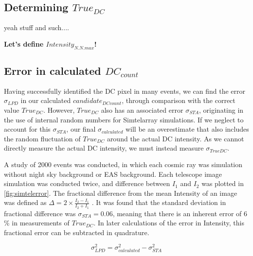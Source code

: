 \documentclass{article}
\begin{document}
\subsection{Determining $True_{DC}$}
yeah stuff and such....

\textbf{Let's define $Intensity_{N.N.max}$!}
 

\subsection{Error in calculated $DC_{count}$}
Having successfully identified the DC pixel in many events, we can find the error $\sigma_{LPD}$ in our calculated $candidate_{DC count}$, through comparison with the correct value $True_{DC}$. However, $True_{DC}$ also has an associated error $\sigma_{STA}$, originating in the use of internal random numbers for Sim\textunderscore telarray simulations. If we neglect to account for this $\sigma_{STA}$, our final $\sigma_{calculated}$ will be an overestimate that also includes the random fluctuation of $True_{DC}$ around the actual DC intensity. As we cannot directly measure the actual DC intensity, we must instead measure $\sigma_{TrueDC}$. 

A study of 2000 events was conducted, in which each cosmic ray was simulation without night sky background or EAS background. Each telescope image simulation was conducted twice, and difference between $I_{1}$ and $I_{2}$ was plotted in \ref{fig:simtelerror}. The fractional difference from the mean Intensity of an image was defined as $\Delta = 2 \times \frac{I_{2} - I_{1}}{{I_{2} + I_{1}}}$ . It was found that the standard deviation in fractional difference was $\sigma_{STA}=0.06$, meaning that there is an inherent error of 6 \% in measurements of $True_{DC}$. In later calculations of the error in Intensity, this fractional error can be subtracted in quadrature. 

\[ \sigma_{LPD}^{2} = \sigma_{calculated}^{2} - \sigma_{STA}^{2}  \]
\end{document}
